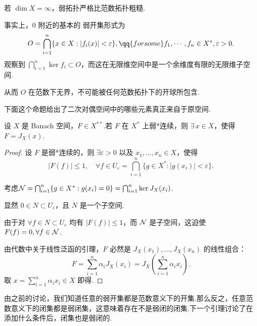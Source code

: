 \begin{attention}
    若 $\dim X = \infty$，弱拓扑严格比范数拓扑粗糙.\par
    事实上，$0$ 附近的基本的 弱开集形式为
    \begin{equation*}
            O = \bigcap_{i=1}^n \{x \in X : |f_i(x)| < \varepsilon\},\qq{for some} f_1,\cdots,f_n\in X^*, \varepsilon > 0.
    \end{equation*}
    观察到 $\bigcap_{i=1}^n \ker f_i \subset O$，而这在无限维空间中是一个余维度有限的无限维子空间.\par
    从而 $O$ 在范数下无界，不可能被任何范数拓扑下的开球所包含.
\end{attention}

下面这个命题给出了二次对偶空间中的哪些元素真正来自于原空间.

\begin{proposition}
    设 $X$ 是 Banach 空间，$F \in X^{**}$.若 $F$ 在 $X^*$ 上弱*连续，则 $\exists\, x \in X$，使得 $F = J_X(x)$.
\end{proposition}
\begin{proof}
    设 $F$ 是弱*连续的，则 $\exists \varepsilon > 0$ 以及 $x_1, \dots, x_n \in X$，使得
    \begin{equation*}
        |F(f)| \leq 1, \quad \forall f \in U_\varepsilon = \bigcap_{i=1}^n \{g \in X^* : |g(x_i)| < \varepsilon\}.
    \end{equation*}

    考虑$\mathcal{N} = \bigcap_{i=1}^n \{g \in X^* : g(x_i) = 0\} = \bigcap_{i=1}^n \ker J_X(x_i)$.\par
    显然 $0 \in N \subset U_\varepsilon$，且 $N$ 是一个子空间.\par
    由于对 $\forall f \in N \subset U_\varepsilon$ 均有 $|F(f)| \leq 1$，而 $\mathcal{N}$ 是子空间，这迫使 $F(f) = 0, \forall f \in \mathcal{N}$.\par
    由代数中关于线性泛函的引理，$F$ 必然是 $J_X(x_1), \dots, J_X(x_n)$ 的线性组合：
    \begin{equation*}
        F = \sum_{i=1}^n \alpha_i J_X(x_i) = J_X\left(\sum_{i=1}^n \alpha_i x_i\right).
    \end{equation*}
    取 $x = \sum_{i=1}^n \alpha_i x_i \in X$ 即得.
\end{proof}

由之前的讨论，我们知道任意的弱开集都是范数意义下的开集.那么反之，任意范数意义下的闭集都是弱闭集，这意味着存在不是弱闭的闭集.下一个引理讨论了在添加什么条件后，闭集也是弱闭的.

